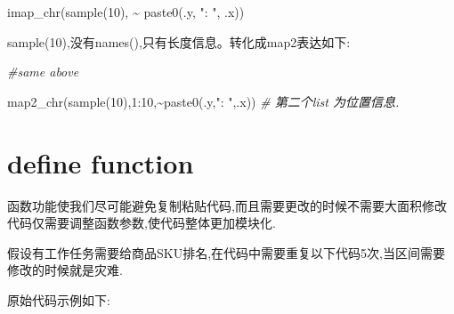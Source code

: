 \documentclass[
]{book}
\newenvironment{Shaded}{\begin{snugshade}}{\end{snugshade}}
\newcommand{\CommentTok}[1]{\textcolor[rgb]{0.56,0.35,0.01}{\textit{#1}}}
\newcommand{\DecValTok}[1]{\textcolor[rgb]{0.00,0.00,0.81}{#1}}
\newcommand{\FunctionTok}[1]{\textcolor[rgb]{0.00,0.00,0.00}{#1}}
\newcommand{\NormalTok}[1]{#1}
\newcommand{\SpecialCharTok}[1]{\textcolor[rgb]{0.00,0.00,0.00}{#1}}
\newcommand{\StringTok}[1]{\textcolor[rgb]{0.31,0.60,0.02}{#1}}
\begin{document}
\begin{Shaded}
\begin{Highlighting}[]
\FunctionTok{imap\_chr}\NormalTok{(}\FunctionTok{sample}\NormalTok{(}\DecValTok{10}\NormalTok{), }\SpecialCharTok{\textasciitilde{}} \FunctionTok{paste0}\NormalTok{(.y, }\StringTok{": "}\NormalTok{, .x))}
\end{Highlighting}
\end{Shaded}

sample(10),没有names(),只有长度信息。转化成map2表达如下:

\begin{Shaded}
\begin{Highlighting}[]
\CommentTok{\#same above}

\FunctionTok{map2\_chr}\NormalTok{(}\FunctionTok{sample}\NormalTok{(}\DecValTok{10}\NormalTok{),}\DecValTok{1}\SpecialCharTok{:}\DecValTok{10}\NormalTok{,}\SpecialCharTok{\textasciitilde{}}\FunctionTok{paste0}\NormalTok{(.y,}\StringTok{": "}\NormalTok{,.x)) }\CommentTok{\# 第二个list 为位置信息.}
\end{Highlighting}
\end{Shaded}

\hypertarget{define-function}{%
\chapter{define function}\label{define-function}}

函数功能使我们尽可能避免复制粘贴代码,而且需要更改的时候不需要大面积修改代码仅需要调整函数参数,使代码整体更加模块化.

假设有工作任务需要给商品SKU排名,在代码中需要重复以下代码5次,当区间需要修改的时候就是灾难.

原始代码示例如下:
\end{document}
